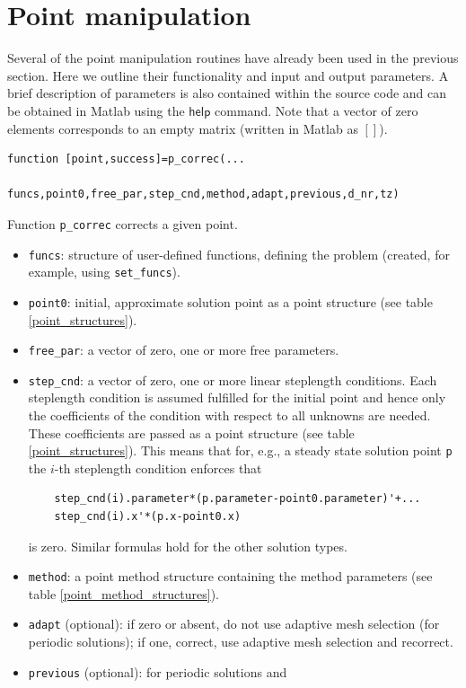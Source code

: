 \documentclass[10pt]{scrartcl}
\newcommand{\parm}[1]{\mathsf{#1}}
\newcommand{\blist}[1]{\mbox{\lstinline!#1!}}
\begin{document}
{\section{Point manipulation}\label{point_manipulation}

Several of the point manipulation routines have already been used in
the previous section.  Here we outline their functionality and input
and output parameters.  A brief description of parameters is also
contained within the source code and can be obtained in Matlab using
the $\parm{help}$ command. Note that a vector of zero elements
corresponds to an empty matrix (written in Matlab as $[]$). 
\begin{lstlisting}
function [point,success]=p_correc(...
          funcs,point0,free_par,step_cnd,method,adapt,previous,d_nr,tz)  
\end{lstlisting}
\noindent Function \blist{p_correc} corrects a given point.
\begin{itemize}
\item \blist{funcs}: structure of user-defined functions, defining the
  problem (created, for example, using \blist{set_funcs}).
\item \blist{point0}: initial, approximate solution point as a point
  structure (see table \ref{point_structures}).
\item \blist{free_par}: a vector of zero, one or more free parameters.
\item \blist{step_cnd}: a vector of zero, one or more linear
  steplength conditions. Each steplength condition is assumed
  fulfilled for the initial point and hence only the coefficients of
  the condition with respect to all unknowns are needed. These
  coefficients are passed as a point structure (see table
  \ref{point_structures}).  This means that for, e.g., a steady state
  solution point \blist{p} the $i$-th steplength condition enforces that
  \begin{lstlisting}
    step_cnd(i).parameter*(p.parameter-point0.parameter)'+...
    step_cnd(i).x'*(p.x-point0.x)
  \end{lstlisting}
  is zero. Similar formulas hold for the other solution types.
\item \blist{method}: a point method structure containing the method
  parameters (see table \ref{point_method_structures}).
\item \blist{adapt} (optional): if zero or absent, do not use adaptive
  mesh selection (for periodic solutions); if one, correct, use
  adaptive mesh selection and recorrect.
\item \blist{previous} (optional): for periodic solutions and

\end{itemize}}
\end{document}

